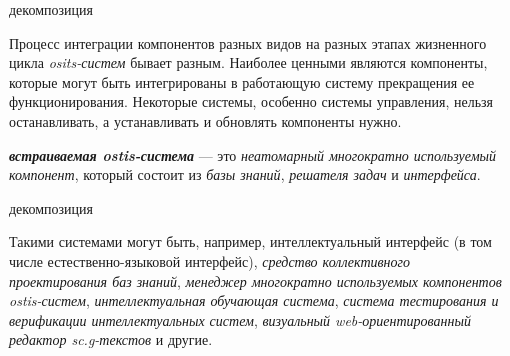 \begin{SCn}
\begin{scnindent}
	\begin{scneqtoset}
		\begin{scnindent}
			\begin{scnrelfromset}{декомпозиция}
			\end{scnrelfromset}
		\end{scnindent}
	\end{scneqtoset}
\end{scnindent}
\end{SCn}

Процесс интеграции компонентов разных видов на разных этапах жизненного цикла \textit{osits-систем} бывает разным. Наиболее ценными являются компоненты, которые могут быть интегрированы в работающую систему  прекращения ее функционирования. Некоторые системы, особенно системы управления, нельзя останавливать, а устанавливать и обновлять компоненты нужно.

\textbf{\textit{встраиваемая ostis-система}} --- это \textit{неатомарный многократно используемый компонент}, который состоит из \textit{базы знаний}, \textit{решателя задач} и \textit{интерфейса}.

\begin{SCn}
	\begin{scnrelfromset}{декомпозиция}
	\end{scnrelfromset}
\end{SCn}

Такими системами могут быть, например, интеллектуальный интерфейс (в том числе естественно-языковой интерфейс), \textit{средство коллективного проектирования баз знаний}, \textit{менеджер многократно используемых компонентов ostis-систем}, \textit{интеллектуальная обучающая система}, \textit{система тестирования и верификации интеллектуальных систем}, \textit{визуальный web-ориентированный редактор sc.g-текстов} и другие.

